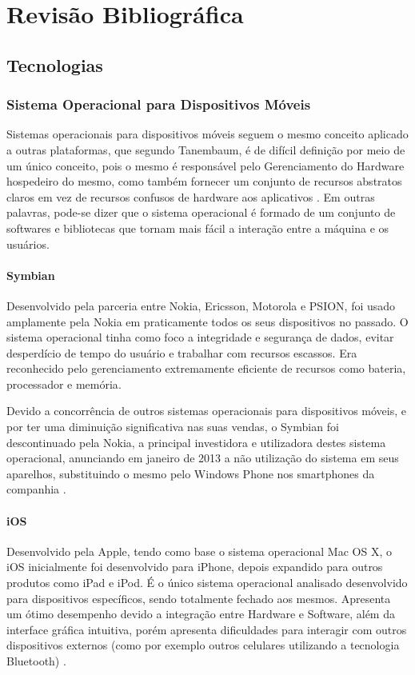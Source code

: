 \chapter{Revisão Bibliográfica}

\section{Tecnologias}

\subsection{Sistema Operacional para Dispositivos Móveis}
Sistemas operacionais para dispositivos móveis seguem o mesmo conceito aplicado a outras plataformas, que segundo Tanembaum, é de difícil definição por meio de um único conceito, pois o mesmo é responsável pelo Gerenciamento do Hardware hospedeiro do mesmo, como também fornecer um conjunto de recursos abstratos claros em vez de recursos confusos de hardware aos aplicativos \cite{tanenbaum2010modern}. Em outras palavras, pode-se dizer que o sistema operacional é formado de um conjunto de softwares e bibliotecas que tornam mais fácil a interação entre a máquina e os usuários.

\subsubsection{Symbian}
Desenvolvido pela parceria entre Nokia, Ericsson, Motorola e PSION, foi usado amplamente pela Nokia em praticamente todos os seus dispositivos no passado. O sistema operacional tinha como foco a integridade e segurança de dados, evitar desperdício de tempo do usuário e trabalhar com recursos escassos. Era reconhecido pelo gerenciamento extremamente eficiente de recursos como bateria, processador e memória\cite{SistemasOperacionaisMoveisComputacao}.

Devido a concorrência de outros sistemas operacionais para dispositivos móveis, e por ter uma diminuição significativa nas suas vendas, o Symbian foi descontinuado pela Nokia, a principal investidora e utilizadora destes sistema operacional, anunciando em janeiro de 2013 a não utilização do sistema em seus aparelhos, substituindo o mesmo pelo Windows Phone nos smartphones da companhia \cite{NokiaSymbian}.

\subsubsection{iOS}
Desenvolvido pela Apple, tendo como base o sistema operacional Mac OS X, o iOS inicialmente foi desenvolvido para iPhone, depois expandido para outros produtos como iPad e iPod. É o único sistema operacional analisado desenvolvido para dispositivos específicos, sendo totalmente fechado aos mesmos. Apresenta um ótimo desempenho devido a integração entre Hardware e Software, além da interface gráfica intuitiva, porém apresenta dificuldades para interagir com outros dispositivos externos (como por exemplo outros celulares utilizando a tecnologia Bluetooth) \cite{AvaliacaoComparativaSOMoveis}.

